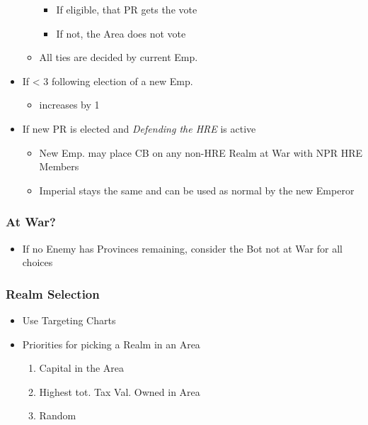 \documentclass[10pt]{article}
\begin{document}
\begin{itemize}
\begin{itemize}
\begin{itemize}
			\item If eligible, that PR gets the vote
			\item If not, the Area does not vote
		\end{itemize}
		\item All ties are decided by current Emp.
	\end{itemize}
	\item If \authority < 3 following election of a new Emp.
	\begin{itemize}
		\item \authority increases by 1
	\end{itemize}
	\item If new PR is elected and \emph{Defending the HRE} is active
	\begin{itemize}
		\item New Emp. may place CB on any non-HRE Realm at War with NPR HRE Members
		\item Imperial \manpower stays the same and can be used as normal by the new Emperor
	\end{itemize}
\end{itemize}


\botrules %

\subsubsection*{At War?}
\begin{itemize}
	\item If no Enemy has Provinces remaining, consider the Bot not at War for all choices
\end{itemize}

\subsubsection*{Realm Selection}
\begin{itemize}
	\item Use Targeting Charts
	\item Priorities for picking a Realm in an Area
	\begin{enumerate}
		\item Capital in the Area
		\item Highest tot. Tax Val. Owned in Area
		\item Random
	\end{enumerate}
\end{itemize}
\end{document}
